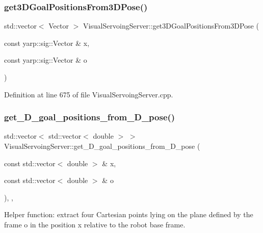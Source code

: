 \subsubsection{\texorpdfstring{get3\+D\+Goal\+Positions\+From3\+D\+Pose()}{get3DGoalPositionsFrom3DPose()}}
{\footnotesize\ttfamily std\+::vector$<$ Vector $>$ Visual\+Servoing\+Server\+::get3\+D\+Goal\+Positions\+From3\+D\+Pose (\begin{DoxyParamCaption}\item[{const yarp\+::sig\+::\+Vector \&}]{x,  }\item[{const yarp\+::sig\+::\+Vector \&}]{o }\end{DoxyParamCaption})\hspace{0.3cm}{\ttfamily [override]}}



Definition at line 675 of file Visual\+Servoing\+Server.\+cpp.

\mbox{\label{classVisualServoingServer_a542e0a6bf6158563a601740363911474}} 
\subsubsection{\texorpdfstring{get\+\_\+D\+\_\+goal\+\_\+positions\+\_\+from\+\_\+D\+\_\+pose()}{get\_3D\_goal\_positions\_from\_3D\_pose()}}
{\footnotesize\ttfamily std\+::vector$<$ std\+::vector$<$ double $>$ $>$ Visual\+Servoing\+Server\+::get\+\_\+D\+\_\+goal\+\_\+positions\+\_\+from\+\_\+D\+\_\+pose (\begin{DoxyParamCaption}\item[{const std\+::vector$<$ double $>$ \&}]{x,  }\item[{const std\+::vector$<$ double $>$ \&}]{o }\end{DoxyParamCaption})\hspace{0.3cm}{\ttfamily [override]}, {\ttfamily [protected]}, {\ttfamily [virtual]}}



Helper function\+: extract four Cartesian points lying on the plane defined by the frame o in the position x relative to the robot base frame. 


